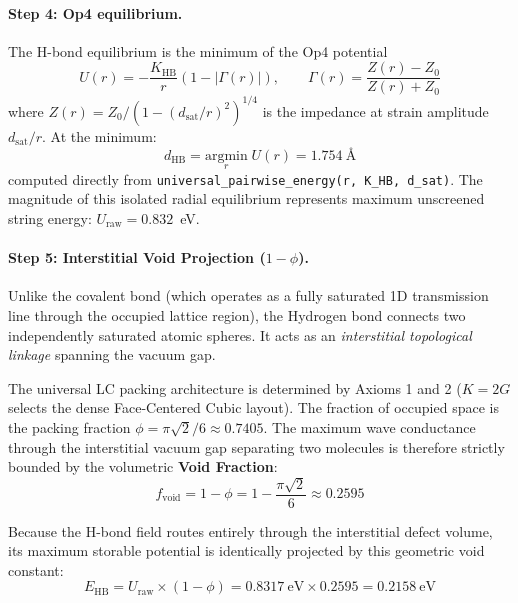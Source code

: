 \paragraph{Step 4: Op4 equilibrium.}
The H-bond equilibrium is the minimum of the Op4 potential
\begin{equation}
    U(r) = -\frac{K_\text{HB}}{r} \left(1 - |\Gamma(r)|\right), \qquad \Gamma(r) = \frac{Z(r) - Z_0}{Z(r) + Z_0}
\end{equation}
where $Z(r) = Z_0 / (1 - (d_\text{sat}/r)^2)^{1/4}$ is the impedance at strain amplitude $d_\text{sat}/r$. At the minimum:
\begin{equation}
    d_\text{HB} = \underset{r}{\text{argmin}} \; U(r) = 1.754~\text{\AA}
    \label{eq:d_hbond}
\end{equation}
computed directly from \texttt{universal\_pairwise\_energy(r, K\_HB, d\_sat)}. The magnitude of this isolated radial equilibrium represents maximum unscreened string energy: $U_\text{raw} = 0.832$~eV.

\paragraph{Step 5: Interstitial Void Projection ($1-\phi$).}
Unlike the covalent bond (which operates as a fully saturated 1D transmission line through the occupied lattice region), the Hydrogen bond connects two independently saturated atomic spheres. It acts as an \emph{interstitial topological linkage} spanning the vacuum gap. 

The universal LC packing architecture is determined by Axioms 1 and 2 ($K=2G$ selects the dense Face-Centered Cubic layout). The fraction of occupied space is the packing fraction $\phi = \pi\sqrt{2}/6 \approx 0.7405$. The maximum wave conductance through the interstitial vacuum gap separating two molecules is therefore strictly bounded by the volumetric \textbf{Void Fraction}:
\begin{equation}
    f_\text{void} = 1 - \phi = 1 - \frac{\pi\sqrt{2}}{6} \approx 0.2595
\end{equation}

Because the H-bond field routes entirely through the interstitial defect volume, its maximum storable potential is identically projected by this geometric void constant:
\begin{equation}
    E_\text{HB} = U_\text{raw} \times (1-\phi) = 0.8317~\text{eV} \times 0.2595 = 0.2158~\text{eV}
    \label{eq:E_hbond}
\end{equation}

